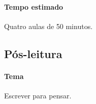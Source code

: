 \documentclass[12pt]{extarticle}
\begin{document}
\paragraph{Tempo estimado} Quatro aulas de 50 minutos.


\subsection{Pós-leitura}

%
%
%
%

\paragraph{Tema} Escrever para pensar.
\end{document}
